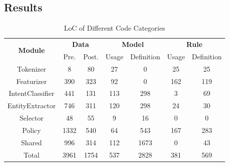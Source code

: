 \subsection{Results}
\begin{table}[!t]
	\caption{LoC of Different Code Categories}
	\vspace{-10pt}
    \footnotesize
	\begin{center}
    \tabcolsep=1.0mm
	\begin{tabular}{ccccccc}
        \hline
        \multirow{2}{*}{\textbf{Module}} & \multicolumn{2}{c}{\textbf{Data}} & \multicolumn{2}{c}{\textbf{Model}} & \multicolumn{2}{c}{\textbf{Rule}} \\ \cline{2-7} 
                                              & Pre. & Post.                 & Usage & Definition                  & Usage & Definition \\ \hline
        \multicolumn{1}{c|}{Tokenizer}        &8      & \multicolumn{1}{c|}{80} &27       & \multicolumn{1}{c|}{0} &25       &25      \\
        \multicolumn{1}{c|}{Featurizer}       &390      & \multicolumn{1}{c|}{323} &92       & \multicolumn{1}{c|}{0} &162       &119      \\
        \multicolumn{1}{c|}{IntentClassifier} &441      & \multicolumn{1}{c|}{131} &113       & \multicolumn{1}{c|}{298} &3       &69      \\
        \multicolumn{1}{c|}{EntityExtractor}  &746      & \multicolumn{1}{c|}{311} &120       & \multicolumn{1}{c|}{298} &24       &30      \\
        \multicolumn{1}{c|}{Selector}         &48      & \multicolumn{1}{c|}{55} &9       & \multicolumn{1}{c|}{16} &0       &0      \\
        \multicolumn{1}{c|}{Policy}           &1332     & \multicolumn{1}{c|}{540} &64       & \multicolumn{1}{c|}{543} &167       &283      \\
        \multicolumn{1}{c|}{Shared}           &996      & \multicolumn{1}{c|}{314} &112       & \multicolumn{1}{c|}{1673} &0       &43      \\
        \multicolumn{1}{c|}{Total}            &3961      & \multicolumn{1}{c|}{1754} &537       & \multicolumn{1}{c|}{2828} &381       &569      \\ \hline
        \end{tabular}
	\label{code_type_stat}
	\end{center}
\end{table}

